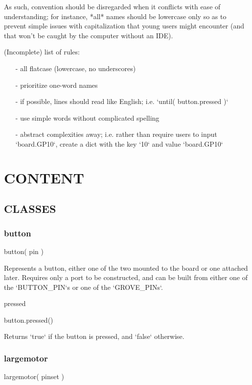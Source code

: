 \documentclass[leqno]{article}
\begin{document}
As such, convention should be disregarded when it conflicts with ease of
understanding; for instance, *all* names should be lowercase only so as to
prevent simple issues with capitalization that young users might encounter (and
that won't be caught by the computer without an IDE).

(Incomplete) list of rules:

\begin{itemize}
  \item[-] all flatcase (lowercase, no underscores)
  \item[-] prioritize one-word names
  \item[-] if possible, lines should read like English; i.e.
    `until( button.pressed )`
  \item[-] use simple words without complicated spelling
  \item[-] abstract complexities away; i.e. rather than require users to input
    `board.GP10`, create a dict with the key `10` and value `board.GP10`
\end{itemize}

\section{CONTENT}

\subsection{CLASSES}

\subsubsection{button}

    button( pin )

Represents a button, either one of the two mounted to the board or one attached
later. Requires only a port to be constructed, and can be built from either one
of the `BUTTON\_PIN`s or one of the `GROVE\_PINs`.

pressed

    button.pressed()

Returns `true` if the button is pressed, and `false` otherwise.

\subsubsection{largemotor}

    largemotor( pinset )
\end{document}
